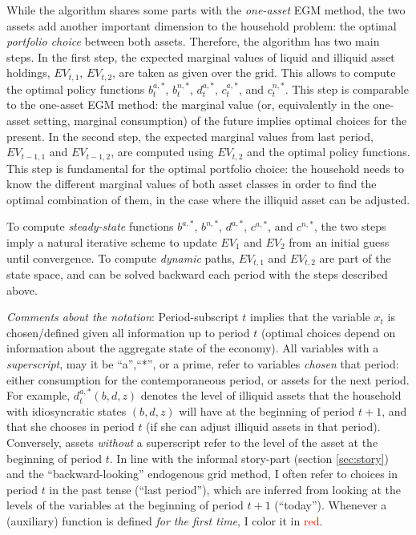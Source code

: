 \documentclass[11pt]{article} %
\begin{document}
While the algorithm shares some parts with the \textit{one-asset} EGM method, the two assets add another important dimension to the household problem: the optimal \textit{portfolio choice} between both assets. Therefore, the algorithm has two main steps. In the first step, the expected marginal values of liquid and illiquid asset holdings, $EV_{t,1}$, $EV_{t,2}$, are taken as given over the grid. This allows to compute the optimal policy functions $b^{a,*}_t$, $b^{n,*}_t$, $d^{a,*}_t$, $c^{a,*}_t$, and $c^{n,*}_t$. This step is comparable to the one-asset EGM method: the marginal value (or, equivalently in the one-asset setting, marginal consumption) of the future implies optimal choices for the present. In the second step, the expected marginal values from last period, $EV_{t-1,1}$ and $EV_{t-1,2}$, are computed using $EV_{t,2}$ and the optimal policy functions. This step is fundamental for the optimal portfolio choice: the household needs to know the different marginal values of both asset classes in order to find the optimal combination of them, in the case where the illiquid asset can be adjusted.

To compute \textit{steady-state} functions  $b^{a,*}$, $b^{n,*}$, $d^{a,*}$, $c^{a,*}$, and $c^{n,*}$, the two steps imply a natural iterative scheme to update $EV_{1}$ and $EV_{2}$ from an initial guess until convergence. To compute \textit{dynamic} paths, $EV_{t,1}$ and $EV_{t,2}$ are part of the state space, and can be solved backward each period with the steps described above.

\textit{Comments about the notation}: Period-subscript $t$ implies that the variable $x_t$ is chosen/defined given all information up to period $t$ (optimal choices depend on information about the aggregate state of the economy). All variables with a \textit{superscript}, may it be ``a'',``*'', or a prime, refer to variables \textit{chosen} that period: either consumption for the contemporaneous period, or assets for the next period. For example, $d^{a,*}_t(b,d,z)$ denotes the level of illiquid assets that the household with idiosyncratic states $(b,d,z)$ will have at the beginning of period $t+1$, and that she chooses in period $t$ (if she can adjust illiquid assets in that period). Conversely, assets \textit{without} a superscript refer to the level of the asset at the beginning of period $t$. In line with the informal story-part (section \ref{sec:story}) and the ``backward-looking'' endogenous grid method, I often refer to choices in period $t$ in the past tense (``last period''), which are inferred from looking at the levels of the variables at the beginning of period $t+1$ (``today''). Whenever a (auxiliary) function is defined \textit{for the first time}, I color it in \textcolor{red}{red}.
\end{document}
